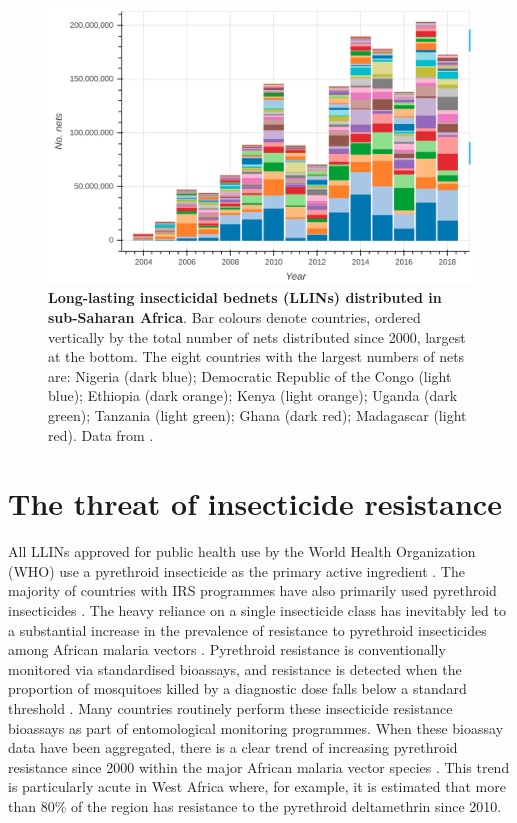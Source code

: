 \documentclass[a4paper,11pt,abstracton,hidelinks]{scrartcl}
\begin{document}
\begin{figure}[t!]
\begin{center}
\includegraphics*[width=1\linewidth,center]{artwork/chapter1/llins.png}
\end{center}
\caption{
%
\textbf{Long-lasting insecticidal bednets (LLINs) distributed in sub-Saharan Africa}.
%
Bar colours denote countries, ordered vertically by the total number of nets distributed since 2000, largest at the bottom.
%
The eight countries with the largest numbers of nets are: Nigeria (dark blue); Democratic Republic of the Congo (light blue); Ethiopia (dark orange); Kenya (light orange); Uganda (dark green); Tanzania (light green); Ghana (dark red); Madagascar (light red).
%
Data from \citet{AMP2020}.
%
}
\label{fig:llins}
\end{figure}


\section{The threat of insecticide resistance}


All LLINs approved for public health use by the World Health Organization (WHO) use a pyrethroid insecticide \citep{Elliott1989} as the primary active ingredient \citep{WHO2020PQVC}. 
%
The majority of countries with IRS programmes have also primarily used pyrethroid insecticides \citep{WHO2019WMR,Tangena2020}.
%
The heavy reliance on a single insecticide class has inevitably led to a substantial increase in the prevalence of resistance to pyrethroid insecticides among African malaria vectors \citep{Hemingway2016}. 
%
Pyrethroid resistance is conventionally monitored via standardised bioassays, and resistance is detected when the proportion of mosquitoes killed by a diagnostic dose falls below a standard threshold \citep{WHO2018TPIRM}. 
%
Many countries routinely perform these insecticide resistance bioassays as part of entomological monitoring programmes. 
%
When these bioassay data have been aggregated, there is a clear trend of increasing pyrethroid resistance since 2000 within the major African malaria vector species \citep{Hancock2020}. 
%
This trend is particularly acute in West Africa where, for example, it is estimated that more than 80\% of the region has resistance to the pyrethroid deltamethrin since 2010. 
\end{document}
